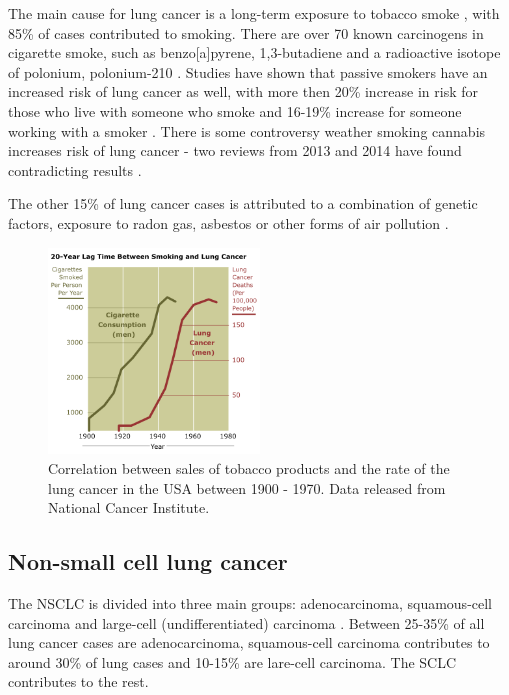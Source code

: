 \documentclass[type=dr, dr=rernat, accentcolor=tud7b,colorbacktitle, bigchapter, openright, twoside, 12pt ]{tudthesis}
\begin{document}
The main cause for lung cancer is a long-term exposure to tobacco smoke \cite{Tsao2008}, with 85\% of cases contributed to smoking. There are over 70 known carcinogens in cigarette smoke, such as benzo[a]pyrene, 1,3-butadiene and a radioactive isotope of polonium, polonium-210 \cite{Hecht2012}.
Studies have shown that passive smokers have an increased risk of lung cancer as well, with more then 20\% increase in risk for those who live with someone who smoke and 16-19\% increase for someone working with a smoker \cite{Taylor2007}.
There is some controversy weather smoking cannabis increases risk of lung cancer - two reviews from 2013 and 2014 have found contradicting results \cite{Tasckin2013, Underner2014}.

The other 15\% of lung cancer cases is attributed to a combination of genetic factors, exposure to radon gas, asbestos or other forms of air pollution \cite{Alberg2010}.

\begin{figure}[H]
	\begin{center}
		\includegraphics[width=0.5\textwidth]{./Images/Smoking.png}
		\caption{Correlation between sales of tobacco products and the rate of the lung cancer in the USA between 1900 - 1970. Data released from National Cancer Institute.}
		\label{Fig:Stages}
	\end{center}
\end{figure}


\subsection{Non-small cell lung cancer}

The NSCLC is divided into three main groups: adenocarcinoma, squamous-cell carcinoma and large-cell (undifferentiated) carcinoma \cite{Kasper2015}.
Between 25-35\% of all lung cancer cases are adenocarcinoma, squamous-cell carcinoma contributes to around 30\% of lung cases and 10-15\% are lare-cell carcinoma. The SCLC contributes to the rest. 
\end{document}
